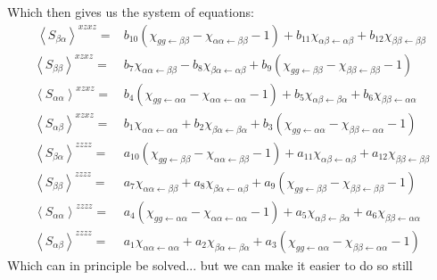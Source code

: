 Which then gives us the system of equations:
\begin{align*}\
	\left \langle S_{\beta \alpha} \right \rangle^{xzxz} =&  b_{10} \left(  \chi_{g g \leftarrow \beta \beta}  -  \chi_{ \alpha \alpha \leftarrow \beta \beta} -1 \right) + b_{11} \chi_{ \alpha  \beta\leftarrow \alpha \beta } + b_{12}  \chi_{ \beta \beta \leftarrow \beta \beta } \\
	\left \langle S_{\beta \beta} \right \rangle^{xzxz} =&  b_7   \chi_{ \alpha \alpha \leftarrow \beta \beta } - b_8 \chi_{\beta  \alpha \leftarrow \alpha \beta } + b_9 \left(  \chi_{g g \leftarrow \beta \beta}  -  \chi_{ \beta \beta \leftarrow \beta \beta} -1 \right)\\
	\left \langle S_{\alpha \alpha} \right \rangle^{xzxz} =&   b_4 \left(  \chi_{g g \leftarrow \alpha \alpha}  -  \chi_{ \alpha \alpha \leftarrow \alpha \alpha} -1 \right) + b_5 \chi_{\alpha \beta \leftarrow \beta \alpha} + b_6 \chi_{\beta \beta \leftarrow \alpha \alpha} \\
	\left \langle S_{\alpha \beta} \right \rangle^{xzxz} =&  b_1  \chi_{\alpha \alpha \leftarrow \alpha \alpha} + b_2 \chi_{\beta \alpha \leftarrow \beta \alpha} + b_3 \left(  \chi_{g g \leftarrow \alpha \alpha}  -  \chi_{\beta \beta \leftarrow \alpha \alpha} -1 \right) \\
	\left \langle S_{\beta \alpha} \right \rangle^{zzzz} =&  a_{10} \left(  \chi_{g g \leftarrow \beta \beta}  -  \chi_{ \alpha \alpha \leftarrow \beta \beta} -1 \right) + a_{11} \chi_{ \alpha  \beta\leftarrow \alpha \beta } + a_{12}  \chi_{ \beta \beta \leftarrow \beta \beta } \\
	\left \langle S_{\beta \beta} \right \rangle^{zzzz} =&  a_7   \chi_{ \alpha \alpha \leftarrow \beta \beta } + a_8 \chi_{\beta  \alpha \leftarrow \alpha \beta } + a_9 \left(  \chi_{g g \leftarrow \beta \beta}  -  \chi_{ \beta \beta \leftarrow \beta \beta} -1 \right) \\
	\left \langle S_{\alpha \alpha} \right \rangle^{zzzz} =&   a_4 \left(  \chi_{g g \leftarrow \alpha \alpha}  -  \chi_{ \alpha \alpha \leftarrow \alpha \alpha} -1 \right) + a_5 \chi_{\alpha \beta \leftarrow \beta \alpha} + a_6 \chi_{\beta \beta \leftarrow \alpha \alpha}  \\
	\left \langle S_{\alpha \beta} \right \rangle^{zzzz} =&  a_1  \chi_{\alpha \alpha \leftarrow \alpha \alpha} + a_2 \chi_{\beta \alpha \leftarrow \beta \alpha} + a_3 \left(  \chi_{g g \leftarrow \alpha \alpha}  -  \chi_{\beta \beta \leftarrow \alpha \alpha} -1 \right)
\end{align*}
Which can in principle be solved... but we can make it easier to do so still
